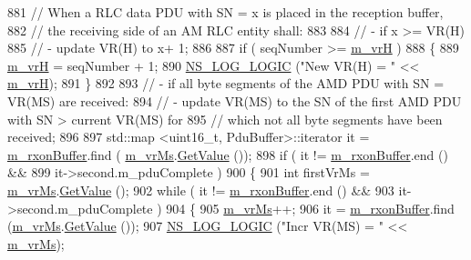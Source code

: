 \begin{DoxyCode}
881       \textcolor{comment}{// When a RLC data PDU with SN = x is placed in the reception buffer,}
882       \textcolor{comment}{// the receiving side of an AM RLC entity shall:}
883 
884       \textcolor{comment}{// - if x >= VR(H)}
885       \textcolor{comment}{//     - update VR(H) to x+ 1;}
886 
887       \textcolor{keywordflow}{if} ( seqNumber >= \hyperlink{classns3_1_1LteRlcAm_a3a0c74b91caa26ab508b4627c703bc1e}{m\_vrH} )
888         \{
889           \hyperlink{classns3_1_1LteRlcAm_a3a0c74b91caa26ab508b4627c703bc1e}{m\_vrH} = seqNumber + 1;
890           \hyperlink{group__logging_ga88acd260151caf2db9c0fc84997f45ce}{NS\_LOG\_LOGIC} (\textcolor{stringliteral}{"New VR(H)  = "} << \hyperlink{classns3_1_1LteRlcAm_a3a0c74b91caa26ab508b4627c703bc1e}{m\_vrH});
891         \}
892 
893       \textcolor{comment}{// - if all byte segments of the AMD PDU with SN = VR(MS) are received:}
894       \textcolor{comment}{//     - update VR(MS) to the SN of the first AMD PDU with SN > current VR(MS) for}
895       \textcolor{comment}{//       which not all byte segments have been received;}
896 
897       std::map <uint16\_t, PduBuffer>::iterator it = \hyperlink{classns3_1_1LteRlcAm_a7442b4f97fccd0c393dd9f27325a853a}{m\_rxonBuffer}.find (
      \hyperlink{classns3_1_1LteRlcAm_a474fc32f3d26bb6762782e8fd7e01c60}{m\_vrMs}.\hyperlink{classns3_1_1SequenceNumber10_a9dcaea04bc415e169e7e0020ce579d01}{GetValue} ());
898       \textcolor{keywordflow}{if} ( it != \hyperlink{classns3_1_1LteRlcAm_a7442b4f97fccd0c393dd9f27325a853a}{m\_rxonBuffer}.end () &&
899            it->second.m\_pduComplete )
900         \{
901           \textcolor{keywordtype}{int} firstVrMs = \hyperlink{classns3_1_1LteRlcAm_a474fc32f3d26bb6762782e8fd7e01c60}{m\_vrMs}.\hyperlink{classns3_1_1SequenceNumber10_a9dcaea04bc415e169e7e0020ce579d01}{GetValue} ();
902           \textcolor{keywordflow}{while} ( it != \hyperlink{classns3_1_1LteRlcAm_a7442b4f97fccd0c393dd9f27325a853a}{m\_rxonBuffer}.end () &&
903                   it->second.m\_pduComplete )
904             \{
905               \hyperlink{classns3_1_1LteRlcAm_a474fc32f3d26bb6762782e8fd7e01c60}{m\_vrMs}++;
906               it = \hyperlink{classns3_1_1LteRlcAm_a7442b4f97fccd0c393dd9f27325a853a}{m\_rxonBuffer}.find (\hyperlink{classns3_1_1LteRlcAm_a474fc32f3d26bb6762782e8fd7e01c60}{m\_vrMs}.\hyperlink{classns3_1_1SequenceNumber10_a9dcaea04bc415e169e7e0020ce579d01}{GetValue} ());
907               \hyperlink{group__logging_ga88acd260151caf2db9c0fc84997f45ce}{NS\_LOG\_LOGIC} (\textcolor{stringliteral}{"Incr VR(MS) = "} << \hyperlink{classns3_1_1LteRlcAm_a474fc32f3d26bb6762782e8fd7e01c60}{m\_vrMs});

\end{DoxyCode}
